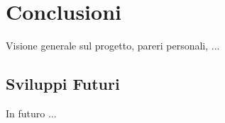 

\chapter{Conclusioni}
Visione generale sul progetto, pareri personali, ... 
    \section{Sviluppi Futuri}
    In futuro ...
